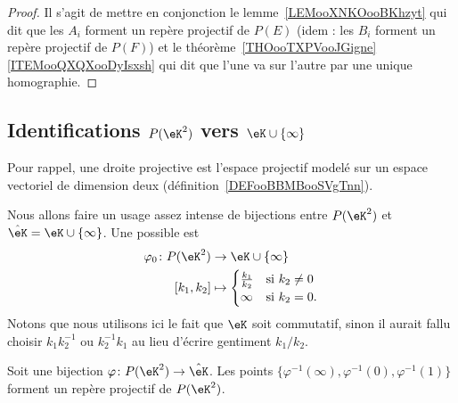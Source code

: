 \begin{proof}
    Il s'agit de mettre en conjonction le lemme~\ref{LEMooXNKOooBKhzyt} qui dit que les \( A_i\) forment un repère projectif de \( P(E)\) (idem : les \( B_i\) forment un repère projectif de \( P(F)\)) et le théorème~\ref{THOooTXPVooJGigne}\ref{ITEMooQXQXooDyIsxsh} qui dit que l'une va sur l'autre par une unique homographie.
\end{proof}

\subsection{Identifications \texorpdfstring{$ P(\eK^2)$}{P(K2)} vers \texorpdfstring{$ \eK\cup\{ \infty \}$}{K u infinity}}

Pour rappel, une droite projective est l'espace projectif modelé sur un espace vectoriel de dimension deux (définition~\ref{DEFooBBMBooSVgTnn}).

\begin{normaltext}      \label{NORMooUQRUooOMIzJD}
    Nous allons faire un usage assez intense de bijections entre \( P(\eK^2)\) et \( \hat\eK=\eK\cup\{ \infty \}\). Une possible est
    \begin{equation}        \label{EQooSIJDooTHPYMb}
        \begin{aligned}
            \varphi_0\colon P(\eK^2)&\to \eK\cup\{ \infty \} \\
            [k_1,k_2]&\mapsto \begin{cases}
                \frac{ k_1 }{ k_2 }    &   \text{si } k_2\neq 0\\
                \infty    &    \text{si } k_2=0.
            \end{cases}
        \end{aligned}
    \end{equation}
    Notons que nous utilisons ici le fait que \( \eK\) soit commutatif, sinon il aurait fallu choisir \( k_1k_2^{-1}\) ou \( k_2^{-1}k_1\) au lieu d'écrire gentiment \( k_1/k_2\).
\end{normaltext}

\begin{corollary}       \label{CORooFJSCooNOeAel}
    Soit une bijection \( \varphi\colon P(\eK^2)\to \hat\eK\). Les points \( \{ \varphi^{-1}(\infty), \varphi^{-1}(0), \varphi^{-1}(1) \}\) forment un repère projectif de \( P(\eK^2)\).
\end{corollary}


